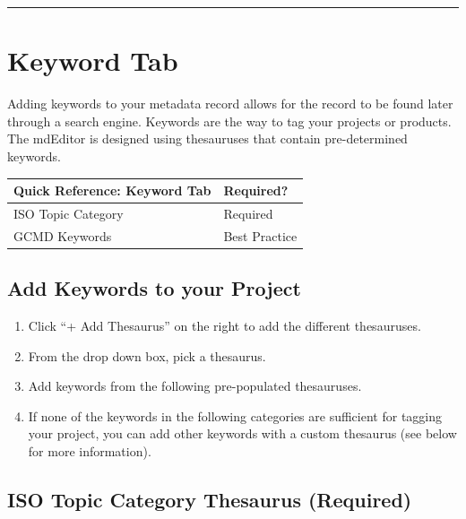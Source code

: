 \documentclass[
]{book}
\providecommand{\tightlist}{%
  \setlength{\itemsep}{0pt}\setlength{\parskip}{0pt}}
\begin{document}
\begin{center}\rule{0.5\linewidth}{\linethickness}\end{center}

\hypertarget{project-keywords}{%
\section*{Keyword Tab}\label{project-keywords}}

Adding keywords to your metadata record allows for the record to be found later through a search engine. Keywords are the way to tag your projects or products. The mdEditor is designed using thesauruses that contain pre-determined keywords.

\begin{longtable}[]{@{}ll@{}}
\toprule
Quick Reference: Keyword Tab & Required?\tabularnewline
\midrule
\endhead
ISO Topic Category & Required\tabularnewline
GCMD Keywords & Best Practice\tabularnewline
\bottomrule
\end{longtable}

\hypertarget{add-keywords-to-your-project}{%
\subsection*{Add Keywords to your Project}\label{add-keywords-to-your-project}}

\begin{enumerate}
\def\labelenumi{\arabic{enumi}.}
\tightlist
\item
  Click ``+ Add Thesaurus'' on the right to add the different thesauruses.
\item
  From the drop down box, pick a thesaurus.
\item
  Add keywords from the following pre-populated thesauruses.
\item
  If none of the keywords in the following categories are sufficient for tagging your project, you can add other keywords with a custom thesaurus (see below for more information).
\end{enumerate}

\hypertarget{iso-topic-category-thesaurus-required}{%
\subsection*{ISO Topic Category Thesaurus (Required)}\label{iso-topic-category-thesaurus-required}}
\end{document}
